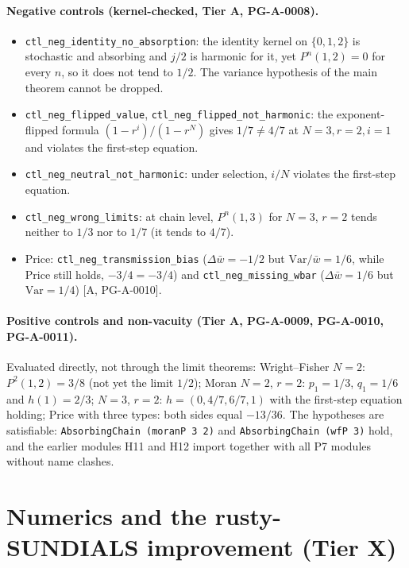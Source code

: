 \documentclass[11pt]{article}
\theoremstyle{remark}
\newcommand{\tier}[1]{\textsf{[#1]}}
\newcommand{\lean}[1]{\texttt{#1}}
\begin{document}
\paragraph{Negative controls (kernel-checked, Tier A, PG-A-0008).}
\begin{itemize}\setlength\itemsep{0pt}
\item \lean{ctl\_neg\_identity\_no\_absorption}: the identity kernel on $\{0,1,2\}$ is stochastic and absorbing and $j/2$ is harmonic for
 it, yet $P^n(1,2)=0$ for every $n$, so it does not tend to $1/2$. The variance hypothesis of the main theorem cannot be dropped.
\item \lean{ctl\_neg\_flipped\_value}, \lean{ctl\_neg\_flipped\_not\_harmonic}: the exponent-flipped formula
 $(1-r^i)/(1-r^N)$ gives $1/7\ne4/7$ at $N=3,r=2,i=1$ and violates the first-step equation.
\item \lean{ctl\_neg\_neutral\_not\_harmonic}: under selection, $i/N$ violates the first-step equation.
\item \lean{ctl\_neg\_wrong\_limits}: at chain level, $P^n(1,3)$ for $N=3$, $r=2$ tends neither to $1/3$ nor to $1/7$ (it tends to $4/7$).
\item Price: \lean{ctl\_neg\_transmission\_bias} ($\Delta\bar w=-1/2$ but $\mathrm{Var}/\bar w=1/6$, while Price still holds,
 $-3/4=-3/4$) and \lean{ctl\_neg\_missing\_wbar} ($\Delta\bar w=1/6$ but $\mathrm{Var}=1/4$) \tier{A, PG-A-0010}.
\end{itemize}



\paragraph{Positive controls and non-vacuity (Tier A, PG-A-0009, PG-A-0010, PG-A-0011).} Evaluated directly, not through the limit theorems:
Wright--Fisher $N=2$: $P^2(1,2)=3/8$ (not yet the limit $1/2$); Moran $N=2$, $r=2$: $p_1=1/3$, $q_1=1/6$ and $h(1)=2/3$;
$N=3$, $r=2$: $h=(0,4/7,6/7,1)$ with the first-step equation holding; Price with three types: both sides equal $-13/36$.
The hypotheses are satisfiable: \lean{AbsorbingChain (moranP 3 2)} and \lean{AbsorbingChain (wfP 3)} hold, and the earlier
modules H11 and H12 import together with all P7 modules without name clashes.

\section{Numerics and the rusty-SUNDIALS improvement (Tier X)}\label{sec:numerics}
\end{document}

